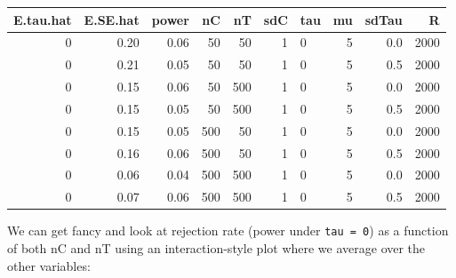 \documentclass[
]{book}
\newenvironment{Shaded}{\begin{snugshade}}{\end{snugshade}}
\newcommand{\AttributeTok}[1]{\textcolor[rgb]{0.77,0.63,0.00}{#1}}
\newcommand{\DecValTok}[1]{\textcolor[rgb]{0.00,0.00,0.81}{#1}}
\newcommand{\FunctionTok}[1]{\textcolor[rgb]{0.00,0.00,0.00}{#1}}
\newcommand{\NormalTok}[1]{#1}
\newcommand{\OtherTok}[1]{\textcolor[rgb]{0.56,0.35,0.01}{#1}}
\newcommand{\SpecialCharTok}[1]{\textcolor[rgb]{0.00,0.00,0.00}{#1}}
\newcommand{\StringTok}[1]{\textcolor[rgb]{0.31,0.60,0.02}{#1}}
\begin{document}
\begin{tabular}{r|r|r|r|r|r|l|r|r|r}
\hline
E.tau.hat & E.SE.hat & power & nC & nT & sdC & tau & mu & sdTau & R\\
\hline
0 & 0.20 & 0.06 & 50 & 50 & 1 & 0 & 5 & 0.0 & 2000\\
\hline
0 & 0.21 & 0.05 & 50 & 50 & 1 & 0 & 5 & 0.5 & 2000\\
\hline
0 & 0.15 & 0.06 & 50 & 500 & 1 & 0 & 5 & 0.0 & 2000\\
\hline
0 & 0.15 & 0.05 & 50 & 500 & 1 & 0 & 5 & 0.5 & 2000\\
\hline
0 & 0.15 & 0.05 & 500 & 50 & 1 & 0 & 5 & 0.0 & 2000\\
\hline
0 & 0.16 & 0.06 & 500 & 50 & 1 & 0 & 5 & 0.5 & 2000\\
\hline
0 & 0.06 & 0.04 & 500 & 500 & 1 & 0 & 5 & 0.0 & 2000\\
\hline
0 & 0.07 & 0.06 & 500 & 500 & 1 & 0 & 5 & 0.5 & 2000\\
\hline
\end{tabular}

We can get fancy and look at rejection rate (power under \texttt{tau\ =\ 0}) as a
function of both nC and nT using an interaction-style plot where we average over the other variables:

\begin{Shaded}
\end{Shaded}
\end{document}

